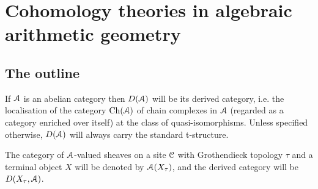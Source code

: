 \section{Cohomology theories in algebraic arithmetic geometry}
    \subsection{The outline}
        \begin{convention}
            If $\mathcal{A}$ is an abelian category then $D(\mathcal{A})$ will be its derived category, i.e. the localisation of the category $\mathrm{Ch}(\mathcal{A})$ of chain complexes in $\mathcal{A}$ (regarded as a category enriched over itself) at the class of quasi-isomorphisms. Unless specified otherwise, $D(\mathcal{A})$ will always carry the standard t-structure.

            The category of $\mathcal{A}$-valued sheaves on a site $\mathcal{C}$ with Grothendieck topology $\tau$ and a terminal object $X$ will be denoted by $\mathcal{A}(X_{\tau})$, and the derived category will be $D(X_{\tau}, \mathcal{A})$.

        \end{convention}

